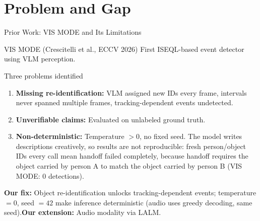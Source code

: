 \documentclass[aspectratio=169,10pt]{beamer}
\begin{document}
\section{Problem and Gap}
\begin{frame}{Prior Work: VIS MODE and Its Limitations}
\footnotesize
\begin{block}{VIS MODE (Crescitelli et al., ECCV 2026)}
First ISEQL-based event detector using VLM perception.
\end{block}
\vspace{0.3em}
\begin{alertblock}{Three problems identified}
\begin{enumerate}
  \item \textbf{Missing re-identification:} VLM assigned new IDs every frame, intervals never spanned multiple frames, \alert{tracking-dependent events undetected}.
  \item \textbf{Unverifiable claims:} Evaluated on unlabeled ground truth.
  \item \textbf{Non-deterministic:} Temperature $>0$, no fixed seed. The model writes descriptions creatively, so results are \alert{not reproducible}: fresh person/object IDs every call mean \alert{handoff failed completely}, because handoff requires the object carried by person A to match the object carried by person B (VIS MODE: 0 detections).
\end{enumerate}
\end{alertblock}
\vspace{0.3em}
\textbf{Our fix:} Object re-identification unlocks tracking-dependent events; temperature $=0$, seed $=42$ make inference deterministic (audio uses greedy decoding, same seed).\hspace{0.5em}\textbf{Our extension:} Audio modality via LALM.
\end{frame}

\end{document}

